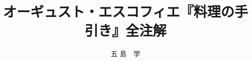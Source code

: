 
%
%

%
%
%

\title{オーギュスト・エスコフィエ『料理の手引き』全注解}
  \author{五 島　学}
  \date{}


\maketitle


\newpage

\newpage

\newpage
\thispagestyle{empty}
\newpage
\newpage
\thispagestyle{empty}
\newpage



\frontmatter


%
% 
%
%








\mainmatter


%










%


%

      
